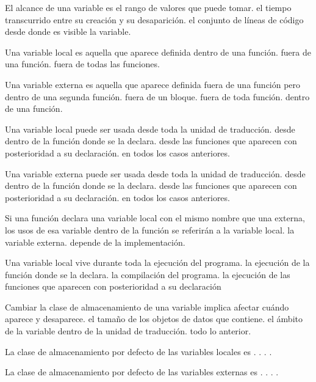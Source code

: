 
\question El alcance de una variable es
\choice el rango de valores que puede tomar.
\choice el tiempo transcurrido entre su creación y su desaparición.
\correctchoice el conjunto de líneas de código desde donde es visible la variable.

\question Una variable local es aquella que aparece definida
\correctchoice dentro de una función.
\choice fuera de una función.
\choice fuera de todas las funciones.

\question Una variable externa es aquella que aparece definida
\choice fuera de una función pero dentro de una segunda función.
\choice fuera de un bloque.
\correctchoice fuera de toda función.
\choice dentro de una función.

\question Una variable local puede ser usada
\choice desde toda la unidad de traducción.
\correctchoice desde dentro de la función donde se la declara.
\choice desde las funciones que aparecen con posterioridad a su declaración.
\choice en todos los casos anteriores.

\question Una variable externa puede ser usada
\choice desde toda la unidad de traducción.
\choice desde dentro de la función donde se la declara.
\correctchoice desde las funciones que aparecen con posterioridad a su declaración.
\choice en todos los casos anteriores.

\question Si una función declara una variable local con el mismo nombre que una externa, los usos de esa variable dentro de la función se referirán a
\correctchoice la variable local.
\choice la variable externa.
\choice depende de la implementación.

\question Una variable local vive durante
\choice toda la ejecución del programa.
\correctchoice la ejecución de la función donde se la declara.
\choice la compilación del programa.
\choice la ejecución de las funciones que aparecen con posterioridad a su declaración

\question Cambiar la clase de almacenamiento de una variable implica afectar 
\correctchoice cuándo aparece y desaparece.
\choice el tamaño de los objetos de datos que contiene.
\choice el ámbito de la variable dentro de la unidad de traducción.
\choice todo lo anterior.

\question La clase de almacenamiento por defecto de las variables locales es
\correctchoice {}.
\choice {}.
\choice {}.
\choice {}.

\question La clase de almacenamiento por defecto de las variables externas es
\choice {}.
\correctchoice {}.
\choice {}.
\choice {}.

